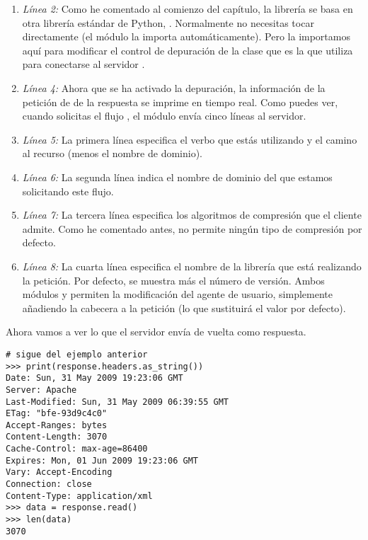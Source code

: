 \begin{enumerate}

\item \emph{Línea 2:} Como he comentado al comienzo del capítulo, la librería  se basa en otra librería estándar de Python, . Normalmente no necesitas tocar directamente  (el módulo  la importa automáticamente). Pero la importamos aquí para modificar el control de depuración de la clase  que es la que utiliza  para conectarse al servidor .

\item \emph{Línea 4:} Ahora que se ha activado la depuración, la información de la petición de de la respuesta  se imprime en tiempo real. Como puedes ver, cuando solicitas el flujo , el módulo  envía cinco líneas al servidor.

\item \emph{Línea 5:} La primera línea especifica el verbo  que estás utilizando y el camino al recurso (menos el nombre de dominio).

\item \emph{Línea 6:} La segunda línea indica el nombre de dominio del que estamos solicitando este flujo.

\item \emph{Línea 7:} La tercera línea especifica los algoritmos de compresión que el cliente admite. Como he comentado antes,  no permite ningún tipo de compresión por defecto.

\item \emph{Línea 8:} La cuarta línea especifica el nombre de la librería que está realizando la petición. Por defecto, se muestra  más el número de versión. Ambos módulos  y  permiten la modificación del agente de usuario, simplemente añadiendo la cabecera  a la petición (lo que sustituirá el valor por defecto).

\end{enumerate}

Ahora vamos a ver lo que el servidor envía de vuelta como respuesta.


\noindent\begin{minipage}{\textwidth}
\begin{lstlisting}[mathescape=False]
# sigue del ejemplo anterior
>>> print(response.headers.as_string())
Date: Sun, 31 May 2009 19:23:06 GMT 
Server: Apache
Last-Modified: Sun, 31 May 2009 06:39:55 GMT
ETag: "bfe-93d9c4c0"                       
Accept-Ranges: bytes
Content-Length: 3070                      
Cache-Control: max-age=86400             
Expires: Mon, 01 Jun 2009 19:23:06 GMT
Vary: Accept-Encoding
Connection: close
Content-Type: application/xml
>>> data = response.read()              
>>> len(data)
3070
\end{lstlisting}
\end{minipage}

